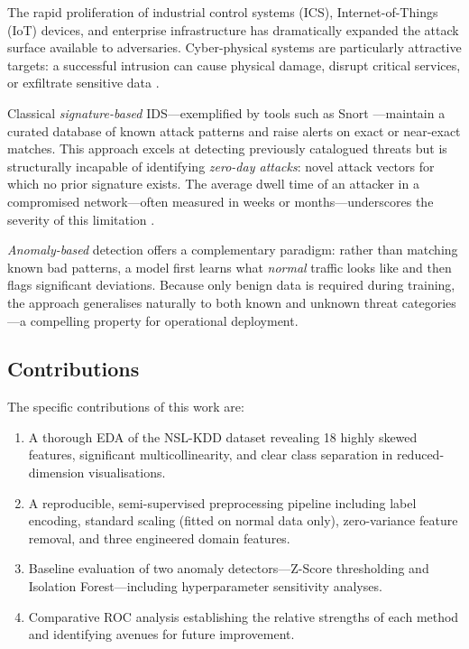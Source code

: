 \documentclass[conference]{IEEEtran}
\begin{document}
The rapid proliferation of industrial control systems (ICS), Internet-of-Things
(IoT) devices, and enterprise infrastructure has dramatically expanded the
attack surface available to adversaries.  Cyber-physical systems are particularly
attractive targets: a successful intrusion can cause physical damage, disrupt
critical services, or exfiltrate sensitive data \cite{chandola2009}.

Classical \emph{signature-based} IDS---exemplified by tools such as Snort
\cite{roesch1999}---maintain a curated database of known attack patterns and raise
alerts on exact or near-exact matches.  This approach excels at detecting
previously catalogued threats but is structurally incapable of identifying
\emph{zero-day attacks}: novel attack vectors for which no prior signature exists.
The average dwell time of an attacker in a compromised network---often measured in
weeks or months---underscores the severity of this limitation \cite{chandola2009}.

\emph{Anomaly-based} detection offers a complementary paradigm: rather than
matching known bad patterns, a model first learns what \emph{normal} traffic looks
like and then flags significant deviations.  Because only benign data is required
during training, the approach generalises naturally to both known and unknown threat
categories---a compelling property for operational deployment.

\subsection{Contributions}
The specific contributions of this work are:
\begin{enumerate}
  \item A thorough EDA of the NSL-KDD dataset revealing 18 highly skewed features,
        significant multicollinearity, and clear class separation in reduced-dimension
        visualisations.
  \item A reproducible, semi-supervised preprocessing pipeline including label
        encoding, standard scaling (fitted on normal data only), zero-variance feature
        removal, and three engineered domain features.
  \item Baseline evaluation of two anomaly detectors---Z-Score thresholding and
        Isolation Forest---including hyperparameter sensitivity analyses.
  \item Comparative ROC analysis establishing the relative strengths of each method
        and identifying avenues for future improvement.
\end{enumerate}
\end{document}
